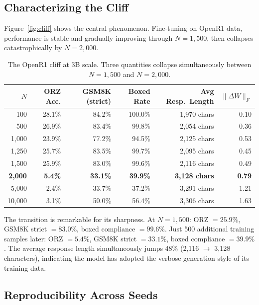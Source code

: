 \documentclass{article}
\begin{document}
\subsection{Characterizing the Cliff}

Figure~\ref{fig:cliff} shows the central phenomenon. Fine-tuning on OpenR1 data, performance is stable and gradually improving through $N{=}1{,}500$, then collapses catastrophically by $N{=}2{,}000$.

\begin{table}[h]
\centering
\caption{The OpenR1 cliff at 3B scale. Three quantities collapse simultaneously between $N{=}1{,}500$ and $N{=}2{,}000$.}
\label{tab:cliff}
\small
\begin{tabular}{@{}rrrrrr@{}}
\toprule
$N$ & ORZ Acc. & GSM8K (strict) & Boxed Rate & Avg Resp.\ Length & $\|\Delta W\|_F$ \\
\midrule
100 & 28.1\% & 84.2\% & 100.0\% & 1,970 chars & 0.10 \\
500 & 26.9\% & 83.4\% & 99.8\% & 2,054 chars & 0.36 \\
1,000 & 23.9\% & 77.2\% & 94.5\% & 2,125 chars & 0.53 \\
1,250 & 25.7\% & 83.5\% & 99.7\% & 2,095 chars & 0.45 \\
1,500 & 25.9\% & 83.0\% & 99.6\% & 2,116 chars & 0.49 \\
\midrule
\textbf{2,000} & \textbf{5.4\%} & \textbf{33.1\%} & \textbf{39.9\%} & \textbf{3,128 chars} & \textbf{0.79} \\
5,000 & 2.4\% & 33.7\% & 37.2\% & 3,291 chars & 1.21 \\
10,000 & 3.1\% & 50.0\% & 56.4\% & 3,306 chars & 1.63 \\
\bottomrule
\end{tabular}
\end{table}

The transition is remarkable for its sharpness. At $N{=}1{,}500$: ORZ $= 25.9\%$, GSM8K strict $= 83.0\%$, boxed compliance $= 99.6\%$. Just 500 additional training samples later: ORZ $= 5.4\%$, GSM8K strict $= 33.1\%$, boxed compliance $= 39.9\%$. The average response length simultaneously jumps 48\% (2,116 $\to$ 3,128 characters), indicating the model has adopted the verbose generation style of its training data.

\subsection{Reproducibility Across Seeds}
\end{document}
